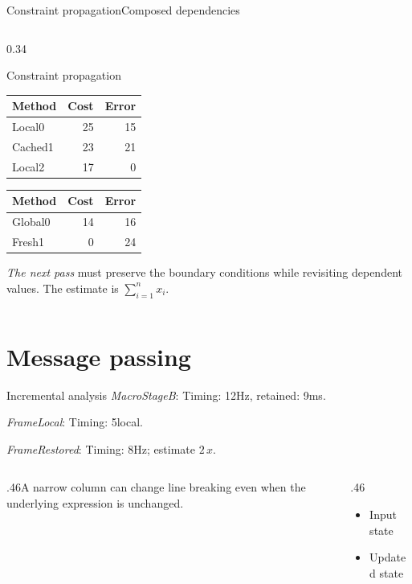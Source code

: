 \documentclass[10pt,aspectratio=43]{beamer}
\newcommand{\fuzzlayerA}[1]{\textbf{#1}}
\newcommand{\fuzzterm}[1]{\fuzzlayerA{#1}}
\newcommand{\fuzzpair}[2]{\fuzzterm{#1}: #2}
\newcommand{\fuzzunit}{ms}
\let\fuzzoriginalunit\fuzzunit
\newcommand{\fuzzcoefficient}{4}
\newcommand{\fuzzscale}[2][\fuzzcoefficient]{#1\,#2}
\begin{document}
\begin{frame}[t,shrink=5]{Constraint propagation}{Composed dependencies}
\begin{columns}[onlytextwidth,T]
\begin{column}{0.34\textwidth}
\begin{description}
\end{description}
\par
\begin{block}{Constraint propagation}
\begin{tabular}{lrr}Method&Cost&Error\\\hline
Local0&25&15\\
Cached1&23&21\\
Local2&17&0\\
\end{tabular}
\par
\begin{tabular}{lrr}Method&Cost&Error\\\hline
Global0&14&16\\
Fresh1&0&24\\
\end{tabular}
\par
\textit{The next pass} must preserve the boundary conditions while revisiting dependent values.  The estimate is $\sum_{i=1}^{n}x_i$.
\end{block}
\end{column}
\end{columns}
\par {}
\end{frame}
\renewcommand{\fuzzunit}{Hz}
\renewcommand{\fuzzcoefficient}{2}
\renewcommand{\fuzzterm}[1]{{\textit{#1}}}
\section{Message passing}
\begin{frame}[t]{Incremental analysis}
\fuzzpair{MacroStageB}{Timing: 12\fuzzunit, retained: 9\fuzzoriginalunit.}\par
{\renewcommand{\fuzzunit}{local}\fuzzpair{FrameLocal}{Timing: 5\fuzzunit.}\par}
\fuzzpair{FrameRestored}{Timing: 8\fuzzunit; estimate $\fuzzscale{x}$.}\par
\begin{columns}[T]\begin{column}{.46\textwidth}A narrow column can change line breaking even when the underlying expression is unchanged.\end{column}\begin{column}{.46\textwidth}\begin{itemize}\item Input state\item Updated state\end{itemize}\end{column}\end{columns}
\end{frame}
\renewcommand{\fuzzunit}{min}
\renewcommand{\fuzzcoefficient}{3}
\renewcommand{\fuzzterm}[1]{{\textit{#1}}}
\end{document}
